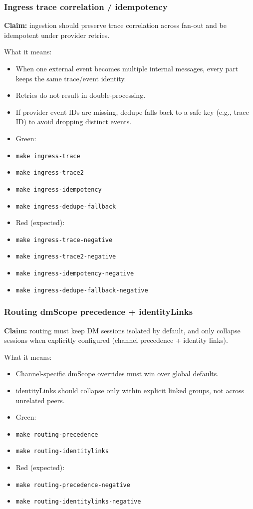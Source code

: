 \subsubsection{Ingress trace correlation / idempotency}


\textbf{Claim:} ingestion should preserve trace correlation across fan-out and be idempotent under provider retries.

What it means:

\begin{itemize}
  \item When one external event becomes multiple internal messages, every part keeps the same trace/event identity.
  \item Retries do not result in double-processing.
  \item If provider event IDs are missing, dedupe falls back to a safe key (e.g., trace ID) to avoid dropping distinct events.
\end{itemize}


\begin{itemize}
  \item Green:
  \item \texttt{make ingress-trace}
  \item \texttt{make ingress-trace2}
  \item \texttt{make ingress-idempotency}
  \item \texttt{make ingress-dedupe-fallback}
  \item Red (expected):
  \item \texttt{make ingress-trace-negative}
  \item \texttt{make ingress-trace2-negative}
  \item \texttt{make ingress-idempotency-negative}
  \item \texttt{make ingress-dedupe-fallback-negative}
\end{itemize}


\subsubsection{Routing dmScope precedence + identityLinks}


\textbf{Claim:} routing must keep DM sessions isolated by default, and only collapse sessions when explicitly configured (channel precedence + identity links).

What it means:

\begin{itemize}
  \item Channel-specific dmScope overrides must win over global defaults.
  \item identityLinks should collapse only within explicit linked groups, not across unrelated peers.
\end{itemize}


\begin{itemize}
  \item Green:
  \item \texttt{make routing-precedence}
  \item \texttt{make routing-identitylinks}
  \item Red (expected):
  \item \texttt{make routing-precedence-negative}
  \item \texttt{make routing-identitylinks-negative}
\end{itemize}



\clearpage
